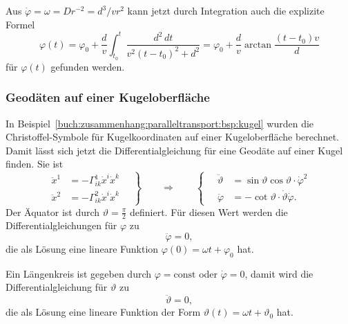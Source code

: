 Aus $\dot{\varphi}=\omega = Dr^{-2} = d^3 / v r^2$
kann jetzt durch Integration auch die explizite Formel 
\[
\varphi(t)
=
\varphi_0
+
\frac{d}{v}
\int_{t_0}^t
\frac{d^2\,dt}{v^2(t-t_0)^2+d^2}
=
\varphi_0
+
\frac{d}{v}
\arctan\frac{(t-t_0)v}{d}
\]
für $\varphi(t)$ gefunden werden.

%
%
\subsubsection{Geodäten auf einer Kugeloberfläche}
In Beispiel~\ref{buch:zusammenhang:paralleltransport:bsp:kugel}
wurden die Christoffel-Symbole für Kugelkoordinaten auf einer
Kugeloberfläche berechnet.
%
Damit lässt sich jetzt die Differentialgleichung für eine Geodäte auf
einer Kugel finden.
Sie ist
\begin{equation}
\left.
\begin{aligned}
\ddot{x}^1 &= -\Gamma^1_{ik}\dot{x}^i\dot{x}^k
\\
\ddot{x}^2 &= -\Gamma^2_{ik}\dot{x}^i\dot{x}^k
\end{aligned}
\quad
\right\}
\qquad\Rightarrow\qquad
\left\{
\quad
\begin{aligned}
\ddot{\vartheta}
&=
\sin\vartheta\cos\vartheta \cdot \dot{\varphi}^2
\\
\ddot{\varphi}
&=
-\cot\vartheta \cdot \dot{\vartheta}\dot{\varphi}.
\end{aligned}
\right.
\label{buch:zusammenhang:geodaeten:kugeldgl}
\end{equation}
Der Äquator ist durch $\vartheta=\frac{\pi}2$ definiert.
Für diesen Wert werden die Differentialgleichungen für $\varphi$ zu
\[
\ddot{\varphi}=0,
\]
die als Lösung eine lineare Funktion
$\varphi(0)=\omega t +\varphi_0$ hat.

Ein Längenkreis ist gegeben durch $\varphi=\text{const}$ oder
$\dot{\varphi}=0$, damit wird die Differentialgleichung für $\vartheta$
zu
\[
\ddot{\vartheta} = 0,
\]
die als Lösung eine lineare Funktion der Form
$\vartheta(t) = \omega t + \vartheta_0$ hat.

